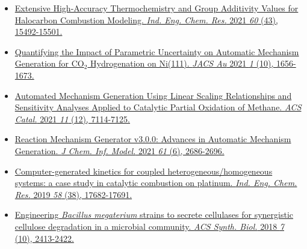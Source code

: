 \documentclass[10pt, line]{res}
\begin{document}
\begin{resume}
\begin{itemize}
    \item \href{https://doi.org/10.1021/acs.iecr.1c03076}{Extensive High-Accuracy Thermochemistry and Group Additivity Values for Halocarbon Combustion Modeling. \textit{Ind. Eng. Chem. Res.} 2021 \textit{60} (43), 15492-15501.}
    \item \href{https://pubs.acs.org/doi/10.1021/jacsau.1c00276} {Quantifying the Impact of Parametric Uncertainty on Automatic Mechanism Generation for CO$_2$ Hydrogenation on Ni(111). \textit{JACS Au} 2021 \textit{1} (10), 1656-1673.}
    \item \href{https://doi.org/10.1021/acscatal.0c04100}{Automated Mechanism Generation Using Linear Scaling Relationships and Sensitivity Analyses Applied to Catalytic Partial Oxidation of Methane. \textit{ACS Catal.} 2021 \textit{11} (12), 7114-7125.}
    \item \href{https://doi.org/10.1021/acs.jcim.0c01480}{Reaction Mechanism Generator v3.0.0: Advances in Automatic Mechanism Generation. \textit{J Chem. Inf. Model.} 2021 \textit{61} (6), 2686-2696.}
    \item \href{https://doi.org/10.1021/acs.iecr.9b01464}{Computer-generated kinetics for coupled heterogeneous/homogeneous systems: a case study in catalytic combustion on platinum. \textit{Ind. Eng. Chem. Res.} 2019 \textit{58} (38), 17682-17691.}
    \item \href{https://doi.org/10.1021/acssynbio.8b00186}{Engineering \textit{Bacillus megaterium} strains to secrete cellulases for synergistic cellulose degradation in a microbial community. \textit{ACS Synth. Biol.} 2018 \textit{7} (10), 2413-2422.}
\end{itemize}




\end{resume}
\end{document}
